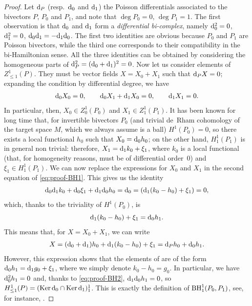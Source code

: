\documentclass[10pt,a4paper]{amsart}
\numberwithin{equation}{section}
\begin{document}
\begin{proof}
Let ${\rm d}_P$ (resp.\ ${\rm d}_0$ and ${\rm d}_1$) the Poisson differentials associated to the bivectors $P$, $P_0$ and $P_1$, and note that $\deg P_0=0$, $\deg P_1=1$. The first observation is that ${\rm d}_0$ and ${\rm d}_1$ form a \emph{differential bi-complex}, namely ${\rm d}_0^2=0$, ${\rm d}_1^2=0$, ${\rm d}_0{\rm d}_1=-{\rm d}_1{\rm d}_0$. The first two identities are obvious because $P_0$ and $P_1$ are Poisson bivectors, while the third one corresponds to their compatibility in the bi-Hamiltonian sense. All the three identities can be obtained by considering the homogeneous parts of ${\rm d}_P^2=({\rm d}_0+{\rm d}_1)^2=0$. Now let us consider elements of $Z^1_{\leq 1}(P)$. They must be vector fields $X=X_0+X_1$ such that ${\rm d}_P X=0$; expanding the condition by differential degree, we have
\begin{gather}\label{eq:proof-BH1}
 {\rm d}_0 X_0=0,\qquad {\rm d}_0X_1+{\rm d}_1X_0=0,\qquad {\rm d}_1X_1=0.
\end{gather}
In particular, then, $X_0\in Z^1_0(P_0)$ and $X_1\in Z^1_1(P_1)$. It has been known for long time \cite{getzler} that, for invertible bivectors $P_0$ (and trivial de~Rham cohomology of the target space $M$, which we always assume is a ball) $H^1(P_0)=0$, so there exists a local functional $h_0$ such that $X_0={\rm d}_0h_0$; on the other hand, $H^1_1(P_1)$ is in general non trivial: therefore, $X_1={\rm d}_1 k_0 + \xi_1$, where $k_0$ is a local functional (that, for homogeneity reasons, must be of differential order~0) and $\xi_1\in H^1_1(P_1)$. We can now replace the expressions for $X_0$ and $X_1$ in the second equation of \eqref{eq:proof-BH1}. This gives us the identity
\begin{gather*}
{\rm d}_0{\rm d}_1k_0+{\rm d}_0\xi_1+{\rm d}_1{\rm d}_0h_0={\rm d}_0=({\rm d}_1(k_0-h_0)+\xi_1)=0,
\end{gather*}
which, thanks to the triviality of $H^1(P_0)$, is
\begin{equation}\label{eq:proof-BH2}
{\rm d}_1(k_0-h_0)+\xi_1={\rm d}_0 h_1.
\end{equation}
This means that, for $X=X_0+X_1$, we can write
\begin{gather*}
X=({\rm d}_0+{\rm d}_1)h_0+{\rm d}_1(k_0-h_0)+\xi_1={\rm d}_P h_0 + {\rm d}_0h_1.
\end{gather*}
However, this expression shows that the elements of  are of the form ${\rm d}_0h_1={\rm d}_1 g_0+\xi_1$, where we simply denote $k_0-h_0=g_0$. In particular, we have ${\rm d}_0^2h_1=0$ and, thanks to \eqref{eq:proof-BH2}, ${\rm d}_1{\rm d}_0h_1=0$, so $H^1_{\leq 1}(P)= (\operatorname{Ker} {\rm d}_0\cap\operatorname{Ker} {\rm d}_1 )^1_{1}$. This is exactly the definition of ${\rm BH}^1_{1}(P_0,P_1)$, see, for instance, \cite{dubrovin2001normal,lz05}.
\end{proof}
\end{document}
